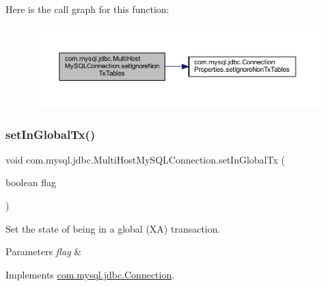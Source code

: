 Here is the call graph for this function\+:
\nopagebreak
\begin{figure}[H]
\begin{center}
\leavevmode
\includegraphics[width=350pt]{classcom_1_1mysql_1_1jdbc_1_1_multi_host_my_s_q_l_connection_a027ef854c24322fe98bd80b458cb82d0_cgraph}
\end{center}
\end{figure}
\mbox{\label{classcom_1_1mysql_1_1jdbc_1_1_multi_host_my_s_q_l_connection_ae2310c7ba07ef821c22538d1a4cc4c84}} 
\subsubsection{\texorpdfstring{set\+In\+Global\+Tx()}{setInGlobalTx()}}
{\footnotesize\ttfamily void com.\+mysql.\+jdbc.\+Multi\+Host\+My\+S\+Q\+L\+Connection.\+set\+In\+Global\+Tx (\begin{DoxyParamCaption}\item[{boolean}]{flag }\end{DoxyParamCaption})}

Set the state of being in a global (XA) transaction.


\begin{DoxyParams}{Parameters}
{\em flag} & \\
\hline
\end{DoxyParams}


Implements \mbox{\hyperlink{interfacecom_1_1mysql_1_1jdbc_1_1_connection_ae5192425468c89f3d404ed0dece17cfc}{com.\+mysql.\+jdbc.\+Connection}}.

